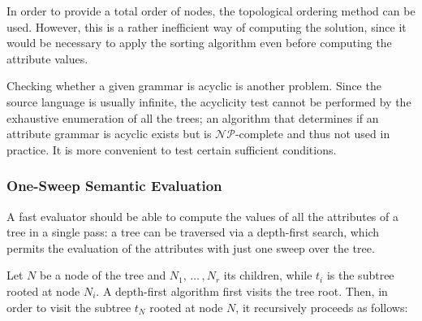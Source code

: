 \documentclass[english]{article}
\begin{document}
In order to provide a total order of nodes, the topological ordering method can be used.
However, this is a rather inefficient way of computing the solution, since it would be necessary to apply the sorting algorithm even before computing the attribute values.

\bigskip
Checking whether a given grammar is acyclic is another problem.
Since the source language is usually infinite, the acyclicity test cannot be performed by the exhaustive enumeration of all the trees;
an algorithm that determines if an attribute grammar is acyclic exists but is \(\mathcal{NP}\)-complete and thus not used in practice.
It is more convenient to test certain sufficient conditions.

\subsubsection{One-Sweep Semantic Evaluation}

A fast evaluator should be able to compute the values of all the attributes of a tree in a single pass:
a tree can be traversed via a depth-first search, which permits the evaluation of the attributes with just one sweep over the tree.

Let \(N\) be a node of the tree and \(N_1, \,\ldots\,, N_r\) its children, while \(t_i\) is the subtree rooted at node \(N_i\).
A depth-first algorithm first visits the tree root.
Then, in order to visit the subtree \(t_N\) rooted at node \(N\), it recursively proceeds as follows:
\end{document}
